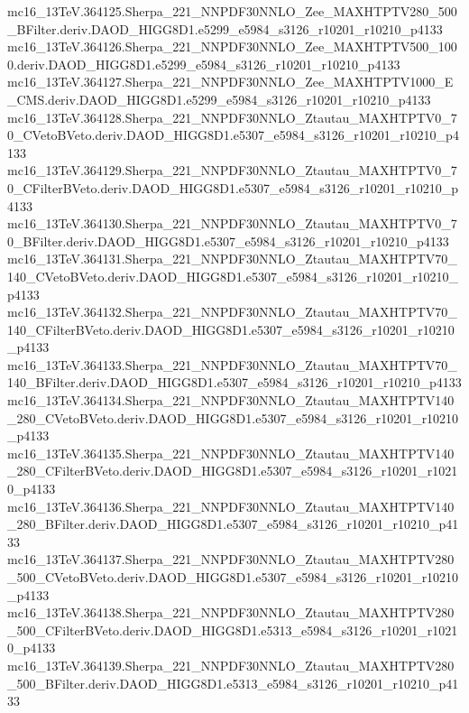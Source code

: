 \begin{scriptsize}
mc16\_13TeV.364125.Sherpa\_221\_NNPDF30NNLO\_Zee\_MAXHTPTV280\_500\_BFilter.deriv.DAOD\_HIGG8D1.e5299\_e5984\_s3126\_r10201\_r10210\_p4133 \\
mc16\_13TeV.364126.Sherpa\_221\_NNPDF30NNLO\_Zee\_MAXHTPTV500\_1000.deriv.DAOD\_HIGG8D1.e5299\_e5984\_s3126\_r10201\_r10210\_p4133 \\
mc16\_13TeV.364127.Sherpa\_221\_NNPDF30NNLO\_Zee\_MAXHTPTV1000\_E\_CMS.deriv.DAOD\_HIGG8D1.e5299\_e5984\_s3126\_r10201\_r10210\_p4133 \\
mc16\_13TeV.364128.Sherpa\_221\_NNPDF30NNLO\_Ztautau\_MAXHTPTV0\_70\_CVetoBVeto.deriv.DAOD\_HIGG8D1.e5307\_e5984\_s3126\_r10201\_r10210\_p4133 \\
mc16\_13TeV.364129.Sherpa\_221\_NNPDF30NNLO\_Ztautau\_MAXHTPTV0\_70\_CFilterBVeto.deriv.DAOD\_HIGG8D1.e5307\_e5984\_s3126\_r10201\_r10210\_p4133 \\
mc16\_13TeV.364130.Sherpa\_221\_NNPDF30NNLO\_Ztautau\_MAXHTPTV0\_70\_BFilter.deriv.DAOD\_HIGG8D1.e5307\_e5984\_s3126\_r10201\_r10210\_p4133 \\
mc16\_13TeV.364131.Sherpa\_221\_NNPDF30NNLO\_Ztautau\_MAXHTPTV70\_140\_CVetoBVeto.deriv.DAOD\_HIGG8D1.e5307\_e5984\_s3126\_r10201\_r10210\_p4133 \\
mc16\_13TeV.364132.Sherpa\_221\_NNPDF30NNLO\_Ztautau\_MAXHTPTV70\_140\_CFilterBVeto.deriv.DAOD\_HIGG8D1.e5307\_e5984\_s3126\_r10201\_r10210\_p4133 \\
mc16\_13TeV.364133.Sherpa\_221\_NNPDF30NNLO\_Ztautau\_MAXHTPTV70\_140\_BFilter.deriv.DAOD\_HIGG8D1.e5307\_e5984\_s3126\_r10201\_r10210\_p4133 \\
mc16\_13TeV.364134.Sherpa\_221\_NNPDF30NNLO\_Ztautau\_MAXHTPTV140\_280\_CVetoBVeto.deriv.DAOD\_HIGG8D1.e5307\_e5984\_s3126\_r10201\_r10210\_p4133 \\
mc16\_13TeV.364135.Sherpa\_221\_NNPDF30NNLO\_Ztautau\_MAXHTPTV140\_280\_CFilterBVeto.deriv.DAOD\_HIGG8D1.e5307\_e5984\_s3126\_r10201\_r10210\_p4133 \\
mc16\_13TeV.364136.Sherpa\_221\_NNPDF30NNLO\_Ztautau\_MAXHTPTV140\_280\_BFilter.deriv.DAOD\_HIGG8D1.e5307\_e5984\_s3126\_r10201\_r10210\_p4133 \\
mc16\_13TeV.364137.Sherpa\_221\_NNPDF30NNLO\_Ztautau\_MAXHTPTV280\_500\_CVetoBVeto.deriv.DAOD\_HIGG8D1.e5307\_e5984\_s3126\_r10201\_r10210\_p4133 \\
mc16\_13TeV.364138.Sherpa\_221\_NNPDF30NNLO\_Ztautau\_MAXHTPTV280\_500\_CFilterBVeto.deriv.DAOD\_HIGG8D1.e5313\_e5984\_s3126\_r10201\_r10210\_p4133 \\
mc16\_13TeV.364139.Sherpa\_221\_NNPDF30NNLO\_Ztautau\_MAXHTPTV280\_500\_BFilter.deriv.DAOD\_HIGG8D1.e5313\_e5984\_s3126\_r10201\_r10210\_p4133 \\

\end{scriptsize}
